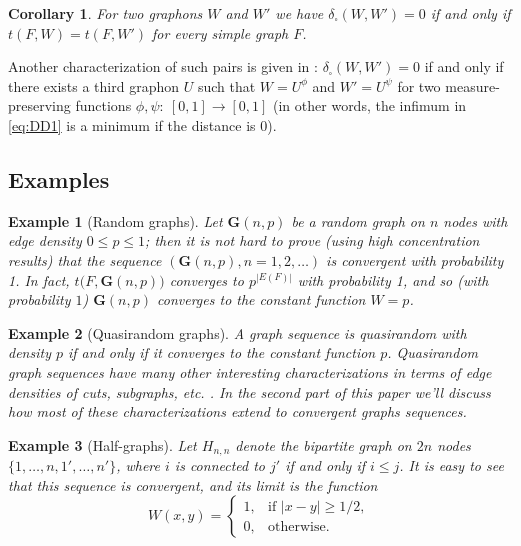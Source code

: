 \documentclass[12pt]{article}
\newtheorem{corollary}[theorem]{Corollary}
\newtheorem{example}{Example}[section]
\numberwithin{equation}{section}
\def\bG{{\mathbf G}}
\begin{document}
\begin{corollary}\label{cor:D=0}
For two graphons $W$ and $W'$ we have $\delta_\square(W,W')=0$ if
and only if $t(F,W)=t(F,W')$ for every simple graph $F$.
\end{corollary}

Another characterization of such pairs is given in \cite{BCL}:
$\delta_\square(W,W')=0$ if and only if there exists a third graphon
$U$ such that $W=U^\phi$ and $W'=U^\psi$ for two measure-preserving
functions $\phi,\psi:~[0,1]\to[0,1]$ (in other words, the infimum in
\eqref{eq:DD1} is a minimum if the distance is $0$).

\subsection{Examples}

\begin{example}[Random graphs]\label{RAND}
Let $\bG(n,p)$ be a random graph on $n$ nodes with edge density $0\le
p\le 1$; then it is not hard to prove (using high concentration
results) that the sequence $(\bG(n,p), n=1,2,\dots)$ is convergent
with probability 1. In fact, $t(F,\bG(n,p){)}$ converges to
$p^{|E(F)|}$ with probability 1, and so (with probability $1$)
$\bG(n,p)$ converges to the constant function $W=p$.
\end{example}


\begin{example}[Quasirandom graphs]\label{Q-RAND}
A graph sequence is quasirandom with density $p$ if and only if it
converges to the constant function $p$.  Quasirandom graph
sequences have many other interesting characterizations in terms of
edge densities of cuts, subgraphs, etc. \cite{CGW}. In the second
part of this paper we'll discuss how most of these characterizations
extend to convergent graphs sequences.
\end{example}

\begin{example}[Half-graphs]\label{HALF}
Let $H_{n,n}$ denote the bipartite graph on $2n$ nodes
$\{1,\dots,n,1',\dots,n'\}$, where $i$ is connected to $j'$ if and
only if $i\le j$. It is easy to see that this sequence is convergent,
and its limit is the function
\[
W(x,y)=
  \begin{cases}
    1, & \text{if $|x-y|\ge 1/2$}, \\
    0, & \text{otherwise}.
  \end{cases}
\]
\end{example}
\end{document}
